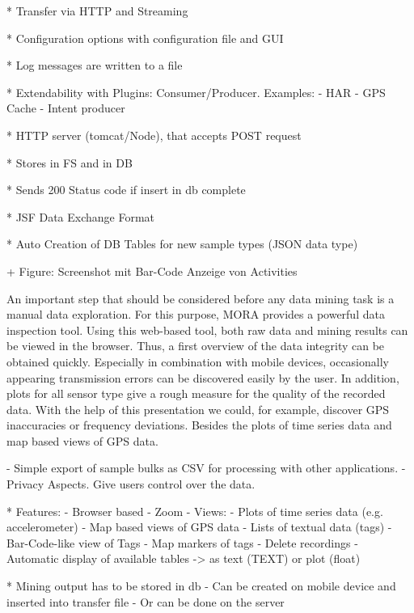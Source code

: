 \documentclass[times, 10pt,twocolumn]{article}
\begin{document}
* Transfer via HTTP and Streaming

* Configuration options with configuration file and GUI

* Log messages are written to a file

* Extendability with Plugins: Consumer/Producer. Examples:
  - HAR
  - GPS Cache
  - Intent producer


* HTTP server (tomcat/Node), that accepts POST request

* Stores in FS and in DB

* Sends 200 Status code if insert in db complete

* JSF Data Exchange Format

* Auto Creation of DB Tables for new sample types (JSON data type)



+ Figure: Screenshot mit Bar-Code Anzeige von Activities


An important step that should be considered before any data mining task is a manual data exploration. For this purpose, MORA provides a powerful data inspection tool. Using this web-based tool, both raw data and mining results can be viewed in the browser. Thus, a first overview of the data integrity can be obtained quickly. Especially in combination with mobile devices, occasionally appearing transmission errors can be discovered easily by the user. In addition, plots for all sensor type give a rough measure for the quality of the recorded data. With the help of this presentation we could, for example, discover GPS inaccuracies or frequency deviations. Besides the plots of time series data and map based views of GPS data.

  
  - Simple export of sample bulks as CSV for processing with other applications.
  - Privacy Aspects. Give users control over the data.

* Features:
  - Browser based
  - Zoom
  - Views:
    - Plots of time series data (e.g. accelerometer)
    - Map based views of GPS data
    - Lists of textual data (tags)
    - Bar-Code-like view of Tags
    - Map markers of tags
  - Delete recordings
  - Automatic display of available tables
    -> as text (TEXT) or plot (float)

* Mining output has to be stored in db
  - Can be created on mobile device and inserted into transfer file
  - Or can be done on the server
\end{document}
